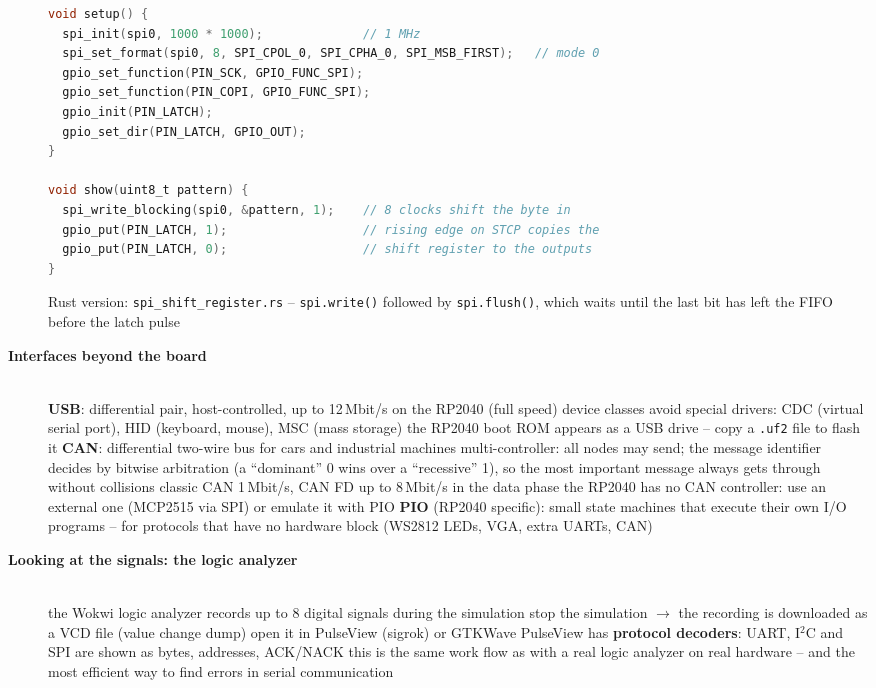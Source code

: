 \begin{description}
\begin{lstlisting}[language=C]
void setup() {
  spi_init(spi0, 1000 * 1000);              // 1 MHz
  spi_set_format(spi0, 8, SPI_CPOL_0, SPI_CPHA_0, SPI_MSB_FIRST);   // mode 0
  gpio_set_function(PIN_SCK, GPIO_FUNC_SPI);
  gpio_set_function(PIN_COPI, GPIO_FUNC_SPI);
  gpio_init(PIN_LATCH);
  gpio_set_dir(PIN_LATCH, GPIO_OUT);
}

void show(uint8_t pattern) {
  spi_write_blocking(spi0, &pattern, 1);    // 8 clocks shift the byte in
  gpio_put(PIN_LATCH, 1);                   // rising edge on STCP copies the
  gpio_put(PIN_LATCH, 0);                   // shift register to the outputs
}
\end{lstlisting}
\bi
	\ite Rust version: \texttt{spi\_shift\_register.rs} -- \texttt{spi.write()} followed by \texttt{spi.flush()}, which waits until the last bit has left the FIFO before the latch pulse
\ei
\os{\newpage}

\item[{\rot\bf Interfaces beyond the board}]~\\[-\lblskip]
\bi
	\ite \textbf{USB}: differential pair, host-controlled, up to 12\,Mbit/s on the RP2040 (full speed)
	\bi
		\ite device classes avoid special drivers: CDC (virtual serial port), HID (keyboard, mouse), MSC (mass storage)
		\ite the RP2040 boot ROM appears as a USB drive -- copy a \texttt{.uf2} file to flash it
	\ei
	\ite \textbf{CAN}: differential two-wire bus for cars and industrial machines
	\bi
		\ite multi-controller: all nodes may send; the message identifier decides by bitwise arbitration (a ``dominant'' 0 wins over a ``recessive'' 1), so the most important message always gets through without collisions
		\ite classic CAN 1\,Mbit/s, CAN FD up to 8\,Mbit/s in the data phase
		\ite the RP2040 has no CAN controller: use an external one (MCP2515 via SPI) or emulate it with PIO
	\ei
	\ite \textbf{PIO} (RP2040 specific): small state machines that execute their own I/O programs -- for protocols that have no hardware block (WS2812 LEDs, VGA, extra UARTs, CAN)
\ei
\os{\newpage}

\item[{\rot\bf Looking at the signals: the logic analyzer}]~\\[-\lblskip]
\bi
	\ite the Wokwi logic analyzer records up to 8 digital signals during the simulation
	\ite stop the simulation $\rightarrow$ the recording is downloaded as a VCD file (value change dump)
	\ite open it in PulseView (sigrok) or GTKWave
	\bi
		\ite PulseView has \textbf{protocol decoders}: UART, I$^2$C and SPI are shown as bytes, addresses, ACK/NACK
	\ei
	\ite this is the same work flow as with a real logic analyzer on real hardware -- and the most efficient way to find errors in serial communication
\ei
\os{\newpage}


\end{description}
